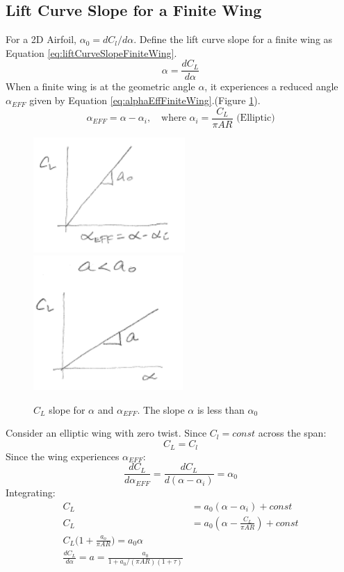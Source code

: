 \documentclass[draft=false, titlepage]{article}
\begin{document}
\subsection{Lift Curve Slope for a Finite Wing}
For a 2D Airfoil, $\alpha_0 = dC_l / d\alpha$. Define the lift curve slope for a finite wing as Equation \ref{eq:liftCurveSlopeFiniteWing}.
\begin{equation}
    \alpha = \frac{dC_L}{d\alpha}
    \label{eq:liftCurveSlopeFiniteWing}
\end{equation}
When a finite wing is at the geometric angle $\alpha$, it experiences a reduced angle $\alpha_{EFF}$ given by Equation \ref{eq:alphaEffFiniteWing}.(Figure \ref{fig:ellipticWingClPg120}).
\begin{equation}
    \alpha_{EFF} = \alpha - \alpha_i,\quad \text{where } \alpha_i = \frac{C_L}{\pi AR} \text{ (Elliptic)}
    \label{eq:alphaEffFiniteWing}
\end{equation}
\begin{figure}[ht]
    \centering
    \includegraphics[width=0.3\linewidth]{Figures/ellipticWingClPg120.PNG}
    \includegraphics[width=0.3\linewidth]{Figures/ellipticWingCl2Pg120.PNG}
    \caption{$C_L$ slope for $\alpha$ and $\alpha_{EFF}$. The slope $\alpha$ is less than $\alpha_0$}
    \label{fig:ellipticWingClPg120}
\end{figure}
Consider an elliptic wing with zero twist. Since $C_l = const$ across the span:
\begin{equation*}
    C_L = C_l
\end{equation*}
Since the wing experiences $\alpha_{EFF}$:
\begin{equation*}
    \frac{d C_L}{d\alpha_{EFF}} = \frac{d C_L}{d(\alpha - \alpha_i)} = \alpha_0
\end{equation*}
Integrating:
\begin{align*}
    C_L &= a_0(\alpha - \alpha_i) + const\\
    C_L &= a_0(\alpha - \frac{C_L}{\pi AR}) + const\\
    C_L \big(1+ \frac{a_o}{\pi AR}\big) = a_0 \alpha\\
    \frac{d C_L}{d\alpha} = a = \frac{a_0}{1+a_0/(\pi AR) (1+\tau)}
\end{align*}
\end{document}
